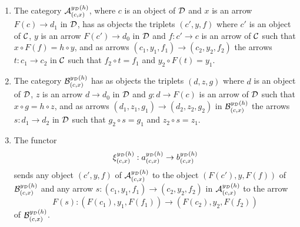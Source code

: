 \documentclass[a4paper,12pt]{article}
\begin{document}
\begin{enumerate}[(1)]
\item The category ${\cal A}^{y_{\cal D}(h)}_{(c, x)}$, where $c$ is an object of $\cal D$ and $x$ is an arrow $F(c)\to d_{1}$ in $\cal D$, has as objects the triplets $(c', y, f)$ where $c'$ is an object of $\cal C$, $y$ is an arrow $F(c')\to d_{0}$ in $\cal D$ and $f:c'\to c$ is an arrow of $\cal C$ such that $x\circ F(f)=h\circ y$, and as arrows $(c_{1}, y_{1}, f_{1})\to (c_{2}, y_{2}, f_{2})$ the arrows $t:c_{1} \to c_{2}$ in $\cal C$ such that $f_{2}\circ t=f_{1}$ and $y_{2} \circ F(t)=y_{1}$.	
	
\item The category ${\cal B}^{y_{\cal D}(h)}_{(c, x)}$ has as objects the triplets $(d, z, g)$ where $d$ is an object of $\cal D$, $z$ is an arrow $d\to d_{0}$ in $\cal D$ and $g:d\to F(c)$ is an arrow of $\cal D$ such that $x\circ g=h\circ z$, and as arrows $(d_{1}, z_{1}, g_{1})\to (d_{2}, z_{2}, g_{2})$ in ${\cal B}^{y_{\cal D}(h)}_{(c, x)}$ the arrows $s:d_{1} \to d_{2}$ in $\cal D$ such that $g_{2}\circ s=g_{1}$ and $z_{2} \circ s=z_{1}$.

\item The functor 
\[
\xi^{y_{\cal D}(h)}_{(c, x)}:a^{y_{\cal D}(h)}_{(c, x)} \to b^{y_{\cal D}(h)}_{(c, x)}  
\]
sends any object $(c', y, f)$ of ${\cal A}^{y_{\cal D}(h)}_{(c, x)}$ to the object $(F(c'), y, F(f))$ of ${\cal B}^{y_{\cal D}(h)}_{(c, x)}$ and any arrow $s:(c_{1}, y_{1}, f_{1})\to (c_{2}, y_{2}, f_{2})$ in ${\cal A}^{y_{\cal D}(h)}_{(c, x)}$ to the arrow 
\[
F(s):(F(c_{1}), y_{1}, F(f_{1}))\to (F(c_{2}), y_{2}, F(f_{2}))
\] 
of ${\cal B}^{y_{\cal D}(h)}_{(c, x)}$. 
\end{enumerate}
\end{document}
